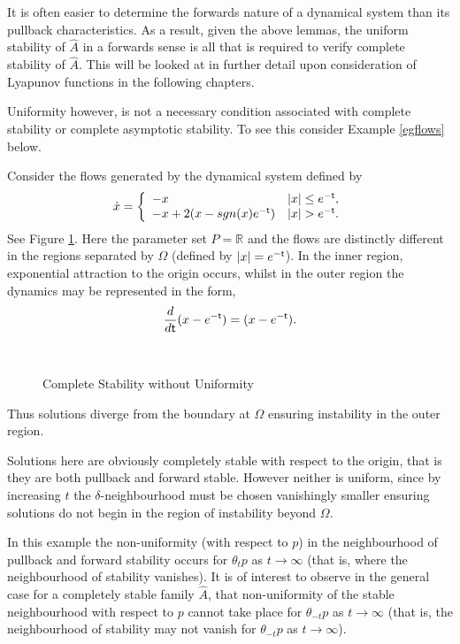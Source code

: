It is often easier to determine the forwards nature of a dynamical
system than its pullback characteristics. As a result, given the
above lemmas, the uniform stability of $\hat{A}$ in a forwards
sense is all that is required to verify complete stability of
$\hat{A}$. This will be looked at in further detail upon
consideration of Lyapunov functions in the following chapters.

Uniformity however, is not a necessary condition associated with
complete stability or complete asymptotic stability. To see this consider
Example \ref{egflows} below.

\begin{eg} \label{egflows}
Consider the flows generated by the dynamical system defined by
\[ \dot{x} = \left\{ \begin{array}{ll} -x & |x| \leq e^{- \mathsf{\mathsf{t}}}, \\
                                           -x + 2(x - sgn(x)e^{- \mathsf{\mathsf{t}}}) & |x| > e^{- \mathsf{\mathsf{t}}}. \\
                                        \end{array} \right. \]
See Figure \ref{csnuspic}. Here the parameter set $P = \mathbb{R}$ and the flows
are distinctly different in the regions separated by $\Omega$ (defined by $|x| =
e^{- \mathsf{\mathsf{t}}}$). In the inner region, exponential attraction to the origin occurs,
whilst in the outer region the dynamics may be represented in the form,
\[ \dfrac{d}{d \mathsf{\mathsf{t}}}(x - e^{- \mathsf{\mathsf{t}}}) = (x - e^{- \mathsf{\mathsf{t}}}). \]

\begin{figure}[htb]
\begin{center}
\leavevmode
\hbox{
  }%
\protect\caption{Complete Stability without Uniformity}
      \protect\label{csnuspic}
\end{center}
\end{figure}

Thus solutions diverge from the boundary at $\Omega$ ensuring instability
in the outer region.

Solutions here are obviously completely stable with respect to the
origin, that is they are both pullback and forward stable. However neither is
uniform, since by increasing $t$ the $\delta$-neighbourhood must be chosen
vanishingly smaller ensuring solutions do not begin in the region of
instability beyond $\Omega$.
\end{eg}

In this example the non-uniformity (with respect to $p$) in the neighbourhood of
pullback and forward stability occurs for $\theta_{t}p$ as $t \to \infty$ (that
is, where the neighbourhood of stability vanishes). It is of interest to observe
in the general case for a completely stable family $\hat{A}$, that
non-uniformity of the stable neighbourhood with respect to $p$
cannot take place for $\theta_{-t}p$ as $t \to \infty$
(that is, the neighbourhood of stability may not vanish for $\theta_{-t}p$ as $t
\to \infty$).

